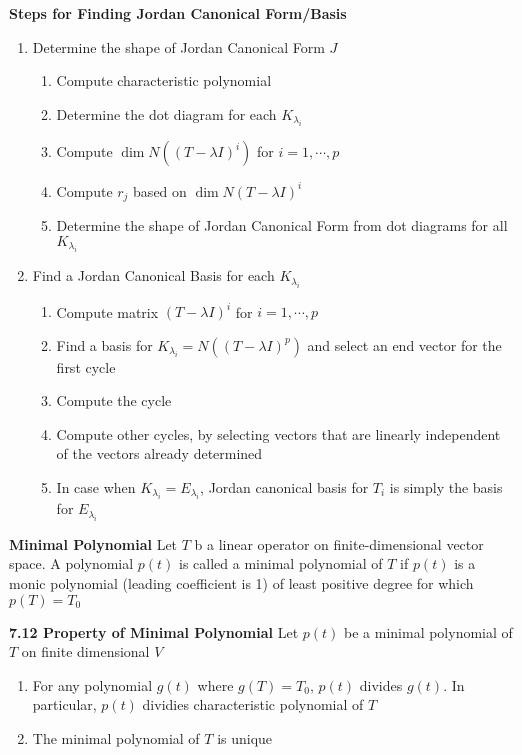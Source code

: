 \documentclass[11pt]{article}
\begin{document}
\begin{defn*}
    \textbf{Steps for Finding Jordan Canonical Form/Basis} \\
    \begin{enumerate}
        \item Determine the shape of Jordan Canonical Form $J$
        \begin{enumerate}
            \item Compute characteristic polynomial 
            \item Determine the dot diagram for each $K_{\lambda_i}$
            \item Compute $\dim{N((T-\lambda I)^i)}$ for $i=1,\cdots, p$
            \item Compute $r_j$ based on $\dim{N(T-\lambda I)^i}$
            \item Determine the shape of Jordan Canonical Form from dot diagrams for all $K_{\lambda_i}$    
        \end{enumerate}
        \item Find a Jordan Canonical Basis for each $K_{\lambda_i}$
        \begin{enumerate}
            \item Compute matrix $(T-\lambda I)^i$ for $i=1,\cdots,p$ 
            \item Find a basis for $K_{\lambda_i} = N((T-\lambda I)^p)$ and select an end vector for the first cycle 
            \item Compute the cycle
            \item Compute other cycles, by selecting vectors that are linearly independent of the vectors already determined
            \item In case when $K_{\lambda_i} = E_{\lambda_i}$, Jordan canonical basis for $T_i$ is simply the basis for $E_{\lambda_i}$
        \end{enumerate}
    \end{enumerate}
\end{defn*}


\begin{defn*}
    \textbf{Minimal Polynomial} Let $T$ b a linear operator on finite-dimensional vector space. A polynomial $p(t)$ is called a minimal polynomial of $T$ if $p(t)$ is a monic polynomial (leading coefficient is 1) of least positive degree for which $p(T) = T_0$ 
\end{defn*}


\begin{theorem*}
    \textbf{7.12 Property of Minimal Polynomial} Let $p(t)$ be a minimal polynomial of $T$ on finite dimensional $V$ 
    \begin{enumerate}
        \item For any polynomial $g(t)$ where $g(T) = T_0$, $p(t)$ divides $g(t)$. In particular, $p(t)$ dividies characteristic polynomial of $T$ 
        \item The minimal polynomial of $T$ is unique
    \end{enumerate}
\end{theorem*}
\end{document}
